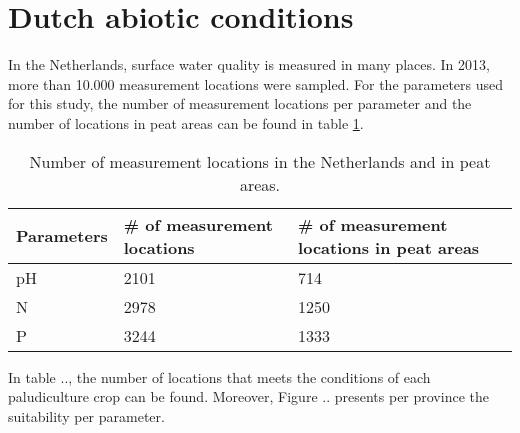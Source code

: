 \documentclass[a4paper,12pt]{scrbook}
\begin{document}



\section{Dutch abiotic conditions}

In the Netherlands, surface water quality is measured in many places. In 2013, more than 10.000 measurement locations were sampled. For the parameters used for this study, the number of measurement locations per parameter and the number of locations in peat areas can be found in table \ref{tab:abioticmeasurements}.

\begin{table}[htbp]
\caption{Number of measurement locations in the Netherlands and in peat areas.}
\begin{center}
\begin{tabular}{|p{5cm}|p{5cm}|p{5cm}|}
\hline
Parameters & \multicolumn{1}{l|}{\# of measurement locations} & \multicolumn{1}{l|}{ \# of measurement locations in peat areas} \\ \hline
pH & 2101 & 714 \\ \hline
N & 2978 & 1250 \\ \hline
P & 3244 & 1333 \\ \hline
\end{tabular}
\end{center}
\label{tab:abioticmeasurements}
\end{table}


In table .., the number of locations that meets the conditions of each paludiculture crop can be found. Moreover, Figure .. presents per province the suitability per parameter. 

\end{document}
